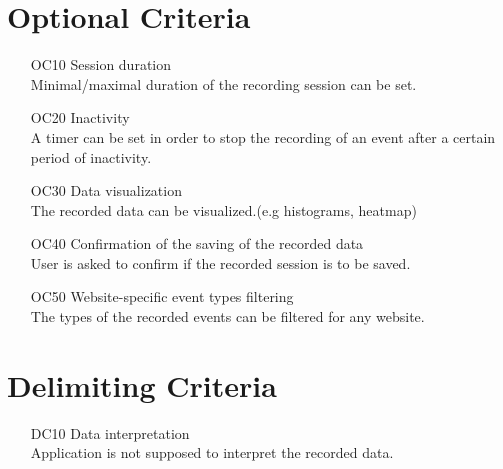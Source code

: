 \section{Optional Criteria}

\begin{itemize}

	\item[OC10]Session duration\\ Minimal/maximal duration of the recording session can be set.
	\item[OC20]Inactivity\\ A timer can be set in order to stop the recording of an event after a certain period of inactivity.
	\item[OC30]Data visualization\\ The recorded data can be visualized.(e.g histograms, heatmap)
	\item[OC40]Confirmation of the saving of the recorded data\\ User is asked to confirm if the recorded session is to be saved.
	\item[OC50]Website-specific event types filtering\\The types of the recorded events can be filtered for any website.

\end{itemize}

\section{Delimiting Criteria}

\begin{itemize}

	\item[DC10]Data interpretation\\Application is not supposed to interpret the recorded data.
	
\end{itemize}